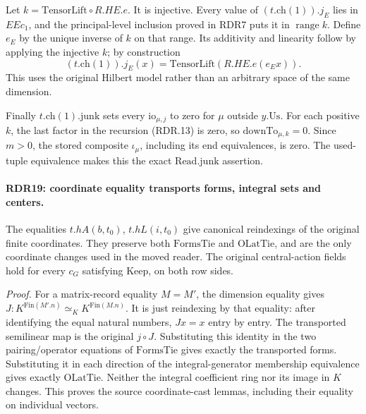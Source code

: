 Let \(k=\mathrm{TensorLift}\circ R.HE.e\).  It is injective.
Every value of \((t.\mathrm{ch}(1)).j_E\) lies in \(EEc_1\),
and the principal-level inclusion proved in RDR7 puts it in
\(\operatorname{range}k\).  Define \(e_E\) by the unique
inverse of \(k\) on that range.  Its additivity and linearity
follow by applying the injective \(k\); by construction
\[
          (t.\mathrm{ch}(1)).j_E(x)
              =\mathrm{TensorLift}(R.HE.e(e_E x)).          \tag{RDR.27}
\]
This uses the original Hilbert model rather than an arbitrary
space of the same dimension.

Finally \(t.\mathrm{ch}(1).\mathrm{junk}\) sets every
\(\mathrm{io}_{\mu,j}\) to zero for \(\mu\) outside
\(y.\mathrm{Us}\).  For each positive \(k\), the last
factor in the recursion (RDR.13) is zero, so
\(\mathrm{downTo}_{\mu,k}=0\).  Since \(m>0\), the
stored composite \(\iota_\mu\), including its end
equivalences, is zero.  The used-tuple equivalence makes
this the exact \(\mathrm{Read.junk}\) assertion.

\paragraph{RDR19: coordinate equality transports forms, integral sets and centers.}
\label{claim:RDR19}
The equalities \(t.hA(b,t_0)\), \(t.hL(i,t_0)\)
give canonical reindexings of the original finite coordinates.
They preserve both \(\mathrm{FormsTie}\) and \(\mathrm{OLatTie}\),
and are the only coordinate changes used in the moved reader.
The original central-action fields hold for every \(c_G\)
satisfying \(\mathrm{Keep}\), on both row sides.

\emph{Proof.}
For a matrix-record equality \(M=M'\), the dimension
equality gives \(J:K^{\mathrm{Fin}(M'.n)}\simeq_K
K^{\mathrm{Fin}(M.n)}\).  It is just reindexing by that
equality: after identifying the equal natural numbers,
\(Jx=x\) entry by entry.  The transported semilinear map is
the original \(j\circ J\).  Substituting this identity in
the two pairing/operator equations of \(\mathrm{FormsTie}\)
gives exactly the transported forms.  Substituting it in
each direction of the integral-generator membership
equivalence gives exactly \(\mathrm{OLatTie}\).  Neither
the integral coefficient ring nor its image in \(K\)
changes.  This proves the source coordinate-cast lemmas,
including their equality on individual vectors.

